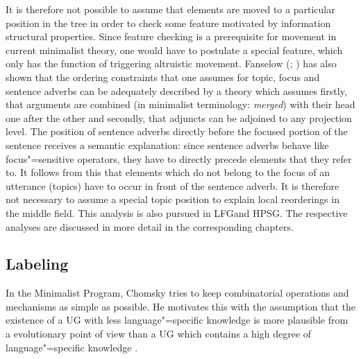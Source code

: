 It is therefore not possible to assume that elements are moved to a particular position in the tree in order to check some feature motivated by
information structural properties. Since feature checking is a prerequisite for movement in current minimalist theory, one would have to postulate
a special feature, which only has the function of triggering altruistic movement. Fanselow (\citeyear[Section~4]{Fanselow2003b}; 
\citeyear[]{Fanselow2006a}) has also shown that the ordering constraints that one assumes for topic, focus and sentence adverbs can be
adequately described by a theory which assumes firstly, that arguments are combined (in minimalist terminology: 
\emph{merged}) with their head one after the other and secondly, that adjuncts can be adjoined to any projection level. The position of sentence adverbs directly before the
focused portion of the sentence receives a semantic explanation: since sentence adverbs behave like focus"=sensitive operators, they have to directly
precede elements that they refer to. It follows from this that elements which do not belong to the focus of an utterance (topics) have to occur
in front of the sentence adverb. It is therefore not necessary to assume a special topic position to explain local reorderings in the middle field.
This analysis is also pursued in LFG\indexlfg and HPSG\indexhpsg. The respective analyses are discussed in more detail in the corresponding chapters.
%



\subsection{Labeling}
\label{Abschnitt-Labeling}

In the Minimalist Program, Chomsky tries to keep combinatorial operations and mechanisms as simple as possible. He motivates this with
the assumption that the existence of a UG with less language"=specific knowledge is more plausible from a evolutionary point of view than a UG
which contains a high degree of language"=specific knowledge \citep[]{Chomsky2008a}.

